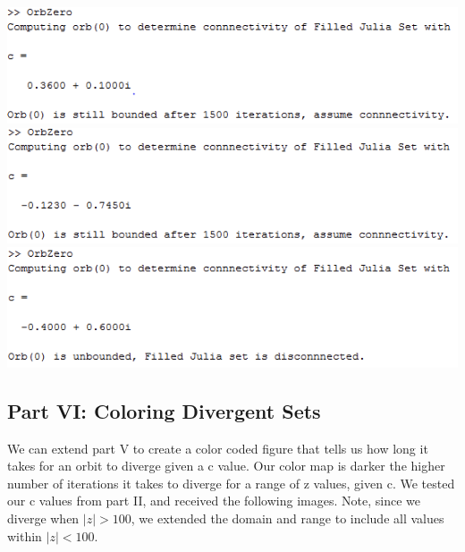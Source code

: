 \documentclass[11pt]{article}
\theoremstyle{plain}
\theoremstyle{definition}
\begin{document}
\includegraphics*[scale = 0.7]{Result1.png}\\
\includegraphics*[scale = 0.7]{Result2.png}\\
\includegraphics*[scale = 0.7]{Result3.png}

\subsection*{Part VI: Coloring Divergent Sets }
We can extend part V to create a color coded figure that tells us how long it takes for an orbit to diverge given a c value. Our color map is darker the higher number of iterations it takes to diverge for a range of z values, given c. We tested our c values from part II, and received the following images. Note, since we diverge when $| z|>100 $, we extended the domain and range to include all values within $ |z|<100 $. \\
\end{document}
